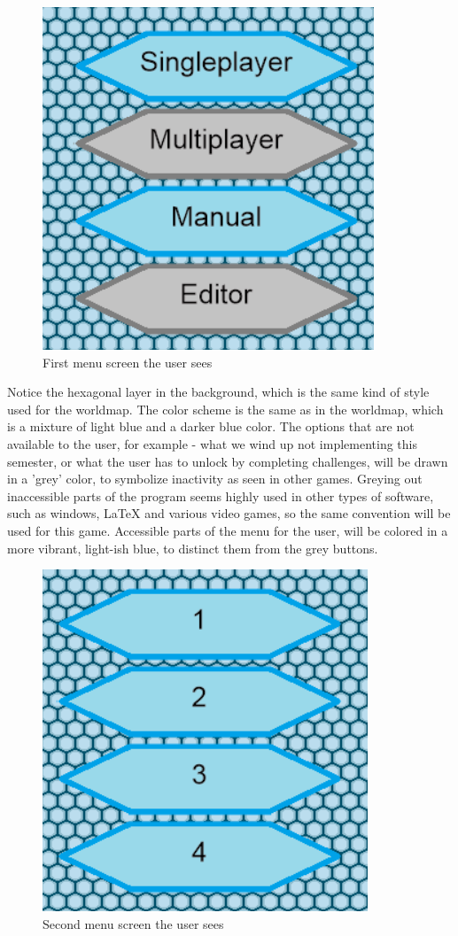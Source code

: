 \begin{figure}[h]
	\centering
		\includegraphics{img/Menu1.png}
	\caption{First menu screen the user sees}
	\label{fig:menu1}
\end{figure}

Notice the hexagonal layer in the background, which is the same kind of style used for the worldmap.
The color scheme is the same as in the worldmap, which is a mixture of light blue and a darker blue color. 
The options that are not available to the user, for example - what we wind up not implementing this semester, or what the user has to unlock by completing challenges, will be drawn in a 'grey' color, to symbolize inactivity as seen in other games. 
Greying out inaccessible parts of the program seems highly used in other types of software, such as windows, LaTeX and various video games, so the same convention will be used for this game.
Accessible parts of the menu for the user, will be colored in a more vibrant, light-ish blue, to distinct them from the grey buttons.\newline

\begin{figure}[h]
	\centering
		\includegraphics{img/Menu2.png}
	\caption{Second menu screen the user sees}
	\label{fig:menu2}
\end{figure}


